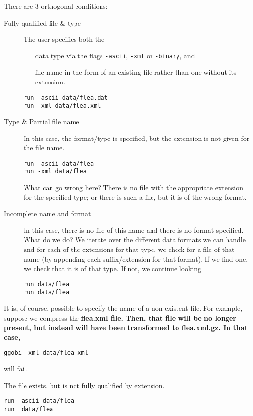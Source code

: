 \documentclass{article}
\def\file#1{\bf{#1}}
\begin{document}
There are 3 orthogonal conditions:
\begin{description}
\item[Fully qualified file \& type] 
The user specifies both the
\begin{itemize}
\item[data type]
via the flags \texttt{-ascii}, \texttt{-xml}
or \texttt{-binary}, and 
\item[file name]
in the form  of an existing file rather than
one without its extension.
\end{itemize}
\begin{verbatim}
run -ascii data/flea.dat
run -xml data/flea.xml
\end{verbatim}
\item[Type \& Partial file name]
In this case, the format/type is specified, 
but the extension is not given for the file name.
\begin{verbatim}
run -ascii data/flea
run -xml data/flea
\end{verbatim}
What can go wrong here? There is no file with the appropriate
extension for the specified type;
or there is such a file, but it is of the wrong format.
\item[Incomplete name and format] In this case, there is no file of
  this name and there is no format specified. What do we do?  We
  iterate over the different data formats we can handle and for each of the
  extensions for that type, we check for a file of that name (by appending
  each suffix/extension for that format). If we find one, we check
  that it is of that type. If not, we continue looking.
\begin{verbatim}
run data/flea
run data/flea
\end{verbatim}
\end{description}

It is, of course, possible to specify the name of a non existent file.
For example, suppose we compress the \file{flea.xml} file.  Then, that
file will be no longer present, but instead will have been transformed
to \file{flea.xml.gz}. In that case, 
\begin{verbatim}
ggobi -xml data/flea.xml
\end{verbatim}
will fail.




The file exists, but is not fully qualified by extension.
\begin{verbatim}
run -ascii data/flea
run  data/flea
\end{verbatim}
\end{document}
